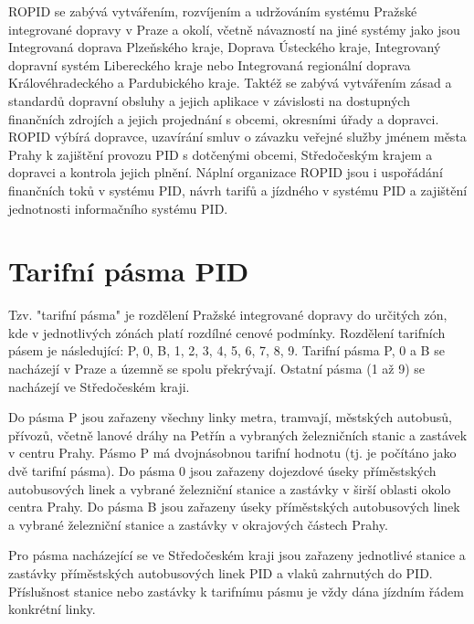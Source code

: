 ROPID se zabývá vytvářením, rozvíjením a udržováním systému Pražské integrované dopravy v Praze a okolí,
včetně návazností na jiné systémy jako jsou Integrovaná doprava Plzeňského kraje,
Doprava Ústeckého kraje, Integrovaný dopravní systém Libereckého kraje nebo 
Integrovaná regionální doprava Královéhradeckého a Pardubického kraje.
Taktéž se zabývá vytvářením zásad a standardů dopravní obsluhy a jejich aplikace v závislosti
na dostupných finančních zdrojích a jejich projednání s obcemi, okresními úřady a dopravci.
ROPID výbírá dopravce, uzavírání smluv o závazku veřejné služby jménem města Prahy 
k zajištění provozu PID s dotčenými obcemi, Středočeským krajem a dopravci a kontrola jejich plnění.
Náplní organizace ROPID jsou i uspořádání finančních toků v systému PID, návrh tarifů a jízdného v systému PID a
zajištění jednotnosti informačního systému PID.  \cite{wikipedia-ropid}

\section{Tarifní pásma PID}

Tzv. "tarifní pásma" je rozdělení Pražské integrované dopravy do určitých zón, kde v jednotlivých
zónách platí rozdílné cenové podmínky. Rozdělení tarifních pásem je následující:
P, 0, B, 1, 2, 3, 4, 5, 6, 7, 8, 9. Tarifní pásma P, 0 a B se nacházejí v Praze a územně
se spolu překrývají. Ostatní pásma (1 až 9) se nacházejí ve Středočeském kraji.

Do pásma P jsou zařazeny všechny linky metra, tramvají, městských autobusů, přívozů,
včetně lanové dráhy na Petřín a vybraných železničních stanic a zastávek v centru Prahy.
Pásmo P má dvojnásobnou tarifní hodnotu (tj. je počítáno jako dvě tarifní pásma).
Do pásma 0 jsou zařazeny dojezdové úseky příměstských autobusových linek a vybrané
železniční stanice a zastávky v širší oblasti okolo centra Prahy.
Do pásma B jsou zařazeny úseky příměstských autobusových linek a vybrané 
železniční stanice a zastávky v okrajových částech Prahy. 

Pro pásma nacházející se ve Středočeském kraji jsou zařazeny jednotlivé stanice 
a zastávky příměstských autobusových linek PID a vlaků zahrnutých do PID. 
Příslušnost stanice nebo zastávky k tarifnímu pásmu je vždy dána jízdním řádem konkrétní linky.\cite{pid}

